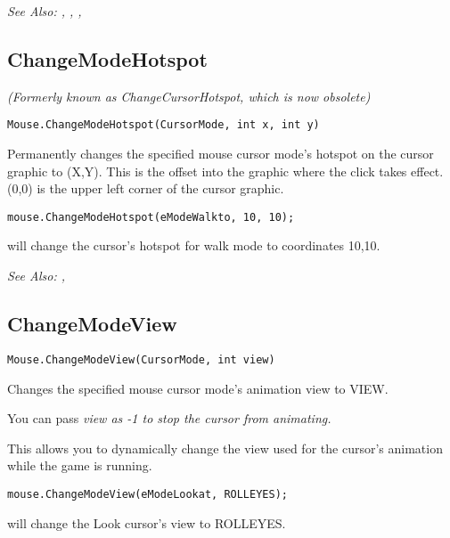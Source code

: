 \it{See Also:} ,
,
,


\subsection{ChangeModeHotspot}\label{Mouse.ChangeModeHotspot}%

\it{(Formerly known as ChangeCursorHotspot, which is now obsolete)}

\begin{verbatim}
Mouse.ChangeModeHotspot(CursorMode, int x, int y)
\end{verbatim}
Permanently changes the specified mouse cursor mode's hotspot on the cursor graphic
to (X,Y). This is the offset into the graphic where the click takes effect.
(0,0) is the upper left corner of the cursor graphic.

\begin{verbatim}
mouse.ChangeModeHotspot(eModeWalkto, 10, 10);
\end{verbatim}
will change the cursor's hotspot for walk mode to coordinates 10,10.

\it{See Also:} ,


\subsection{ChangeModeView}\label{Mouse.ChangeModeView}%

\begin{verbatim}
Mouse.ChangeModeView(CursorMode, int view)
\end{verbatim}
Changes the specified mouse cursor mode's animation view to VIEW.

You can pass \it{view} as -1 to stop the cursor from animating.

This allows you to dynamically change the view used for the cursor's animation
while the game is running.

\begin{verbatim}
mouse.ChangeModeView(eModeLookat, ROLLEYES);
\end{verbatim}
will change the Look cursor's view to ROLLEYES.

